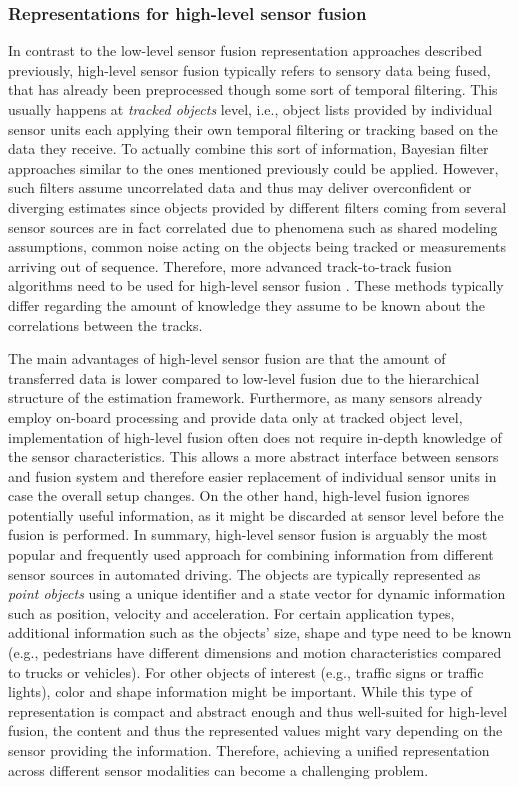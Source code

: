 \subsubsection{Representations for high-level sensor fusion}

In contrast to the low-level sensor fusion representation approaches described previously, high-level sensor fusion typically refers to sensory data being fused, that has already been preprocessed though some sort of temporal filtering.
This usually happens at \emph{tracked objects} level, i.e., object lists provided by individual sensor units each applying their own temporal filtering or tracking based on the data they receive.
To actually combine this sort of information, Bayesian filter approaches similar to the ones mentioned previously could be applied. 
However, such filters assume uncorrelated data and thus may deliver overconfident or diverging estimates since objects provided by different filters coming from several sensor sources are in fact correlated due to phenomena such as shared modeling assumptions, common noise acting on the objects being tracked or measurements arriving out of sequence.
Therefore, more advanced track-to-track fusion algorithms need to be used for high-level sensor fusion \parencite{Tian2010, Aeberhard2012}.
These methods typically differ regarding the amount of knowledge they assume to be known about the correlations between the tracks.

The main advantages of high-level sensor fusion are that the amount of transferred data is lower compared to low-level fusion due to the hierarchical structure of the estimation framework.
Furthermore, as many sensors already employ on-board processing and provide data only at tracked object level, implementation of high-level fusion often does not require in-depth knowledge of the sensor characteristics.
This allows a more abstract interface between sensors and fusion system and therefore easier replacement of individual sensor units in case the overall setup changes.
On the other hand, high-level fusion ignores potentially useful information, as it might be discarded at sensor level before the fusion is performed.
In summary, high-level sensor fusion is arguably the most popular and frequently used approach for combining information from different sensor sources in automated driving.
The objects are typically represented as \emph{point objects} using a unique identifier and a state vector for dynamic information such as position, velocity and acceleration.
For certain application types, additional information such as the objects' size, shape and type need to be known (e.g., pedestrians have different dimensions and motion characteristics compared to trucks or vehicles).
For other objects of interest (e.g., traffic signs or traffic lights), color and shape information might be important.
While this type of representation is compact and abstract enough and thus well-suited for high-level fusion, the content and thus the represented values might vary depending on the sensor providing the information.
Therefore, achieving a unified representation across different sensor modalities can become a challenging problem.


